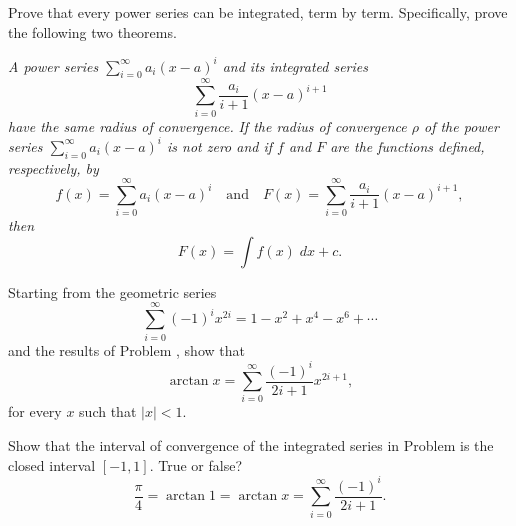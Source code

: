 \begin{exercises}
Prove that every power series can be integrated,
term by term.  Specifically,
prove the following two theorems.
\begin{exenum}
\x
\emph{A power series
$\sum_{i=0}^\infty a_i(x-a)^i$ and its integrated
series
\[
\sum_{i=0}^\infty \frac{a_i}{i+1} (x-a)^{i+1}
\]
have the same radius of convergence.}
\x
\emph{If the radius of convergence $\rho$
of the power series
$\sum_{i=0}^\infty a_i(x-a)^i$
is not zero and if $f$ and $F$ are the functions
defined, respectively, by
\[
f(x) = \sum_{i=0}^\infty a_i(x-a)^i \quad \mbox{and}
\quad F(x) = \sum_{i=0}^\infty \frac{a_i}{i+1} (x-a)^{i+1}
,
\]
then
\[
F(x) = \int f(x) \; dx + c
.
\]
}
\end{exenum}

Starting from the geometric series
\[
\sum_{i=0}^\infty (-1)^ix^{2i} =
1 - x^2 + x^4 - x^6 + \cdots
\]
and the results of Problem , show that
\[
\arctan x = \sum_{i=0}^\infty
\frac{(-1)^i}{2i+1} x^{2i+1}
,
\]
for every $x$ such that $|x| < 1$.

\begin{exenum}
\x
Show that the interval of convergence of the
integrated series in Problem 
is the closed interval $[-1,1]$.
\x
True or false?
\[
\frac{\pi}4 = \arctan 1 = \arctan x = \sum_{i=0}^\infty
\frac{(-1)^i}{2i+1}
.
\]
\end{exenum}

\end{exercises}
